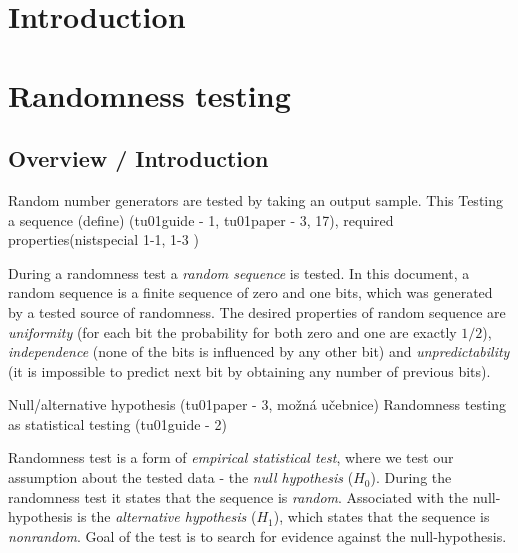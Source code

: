 \documentclass[
  digital,     %
  oneside,     %
  nosansbold,  %
  nocolorbold, %
  nolof,         %
  nolot,         %
]{fithesis4}
\begin{document}
\chapter*{Introduction}


\chapter{Randomness testing}

\section{Overview / Introduction}

Random number generators are tested by taking an output sample. This 
Testing a sequence (define) (tu01guide - 1, tu01paper - 3, 17), required properties(nistspecial 1-1, 1-3 )


During a randomness test a \emph{random sequence} is tested. In this document, a random sequence is a finite sequence of zero and one bits, which was generated by a tested source of randomness. The desired properties of random sequence are \emph{uniformity} (for each bit the probability for both zero and one are exactly $1/2$), \emph{independence} (none of the bits is influenced by any other bit) and \emph{unpredictability} (it is impossible to predict next bit by obtaining any number of previous bits). \cite[p. 1-1]{nist_special}

Null/alternative hypothesis (tu01paper - 3, možná učebnice)
Randomness testing as statistical testing (tu01guide - 2)

Randomness test is a form of \emph{empirical statistical test}, where we test our assumption about the tested data - the \emph{null hypothesis} ($H_0$). During the randomness test it states that the sequence is \emph{random}. Associated with the null-hypothesis is the \emph{alternative hypothesis} ($H_1$), which states that the sequence is \emph{nonrandom}. Goal of the test is to search for evidence against the null-hypothesis. \cite[p. 2]{tu01_guide}
\end{document}
